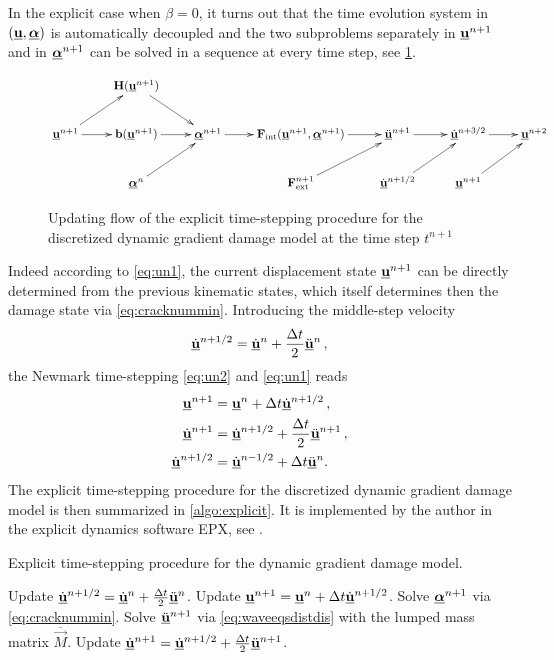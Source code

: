 In the explicit case when $\beta=0$, it turns out that the time evolution system in $(\uvec,\dvec)$ is automatically decoupled and the two subproblems separately in $\uvec^{n+1}$ and in $\dvec^{n+1}$ can be solved in a sequence at every time step, see \cref{fig:updatestate}.
\begin{figure}[htbp]
\centering
\[
\xymatrix{ & \vec{H}(\uvec^{n+1}) \ar[dr] & & & & & \\
\uvec^{n+1} \ar[ur] \ar[r] & \vec{b}(\uvec^{n+1}) \ar[r] & \dvec^{n+1} \ar[r] & \vec{F}_\mathrm{int}(\uvec^{n+1},\dvec^{n+1}) \ar[r] & \ddot{\uvec}^{n+1} \ar[r] & \dot{\uvec}^{n+3/2} \ar[r] & \uvec^{n+2} \\
& \dvec^n \ar[ur] & & \vec{F}_\mathrm{ext}^{n+1} \ar[ur] & \dot{\uvec}^{n+1/2} \ar[ur] & \uvec^{n+1} \ar[ur] &}
\]
\caption{Updating flow of the explicit time-stepping procedure for the discretized dynamic gradient damage model at the time step $t^{n+1}$}
\label{fig:updatestate}
\end{figure}
Indeed according to \eqref{eq:un1}, the current displacement state $\uvec^{n+1}$ can be directly determined from the previous kinematic states, which itself determines then the damage state via \eqref{eq:cracknummin}. Introducing the middle-step velocity
\[
\dot{\uvec}^{n+1/2}=\dot{\uvec}^n+\frac{\Delta t}{2}\ddot{\uvec}^n\,,
\]
the Newmark time-stepping \eqref{eq:un2} and \eqref{eq:un1} reads
\begin{align*}
\uvec^{n+1} &= \uvec^n+\Delta t\dot{\uvec}^{n+1/2}\,, \\
\dot{\uvec}^{n+1} &= \dot{\uvec}^{n+1/2}+\frac{\Delta t}{2}\ddot{\uvec}^{n+1}\,, \\
\dot{\uvec}^{n+1/2} &= \dot{\uvec}^{n-1/2}+\Delta t\ddot{\uvec}^{n}.
\end{align*}
The explicit time-stepping procedure for the discretized dynamic gradient damage model is then summarized in \cref{algo:explicit}. It is implemented by the author in the explicit dynamics software EPX, see \cite{EPX:2015}.
\begin{algorithm}[htbp]
\caption{Explicit time-stepping procedure for the dynamic gradient damage model.} \label{algo:explicit}
\begin{algorithmic}[1]\linespread{1.2}\selectfont\normalsize
{}
  \State Update $\dot{\uvec}^{n+1/2}=\dot{\uvec}^{n}+\frac{\Delta t}{2}\ddot{\uvec}^n$.
  \State Update $\uvec^{n+1}=\uvec^n+\Delta t\dot{\uvec}^{n+1/2}$.
  \State Solve $\dvec^{n+1}$ via \eqref{eq:cracknummin}.
  \State Solve $\ddot{\uvec}^{n+1}$ via \eqref{eq:waveeqsdistdis} with the lumped mass matrix $\overline{\vec{M}}$.
  \State Update $\dot{\uvec}^{n+1}=\dot{\uvec}^{n+1/2}+\frac{\Delta t}{2}\ddot{\uvec}^{n+1}$.
\EndFor
\end{algorithmic}
\end{algorithm}

